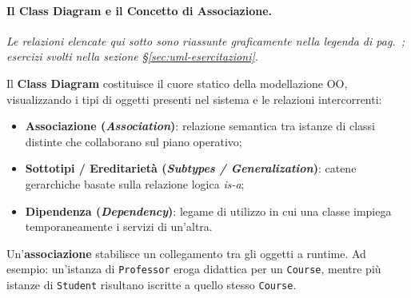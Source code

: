 \documentclass[12pt]{extarticle}
\newcommand{\cn}[1]{\makebox[\linewidth][c]{\textbf{#1}}}
\begin{document}
\paragraph{Il Class Diagram e il Concetto di Associazione.}
\noindent\textit{Le relazioni elencate qui sotto sono riassunte graficamente nella legenda di pag.~\pageref{fig:uml-legenda-relazioni}; esercizi svolti nella sezione \S\ref{sec:uml-esercitazioni}.}

Il \textbf{Class Diagram} costituisce il cuore statico della modellazione OO, visualizzando i tipi di oggetti presenti nel sistema e le relazioni intercorrenti:
\begin{itemize}
    \item \textbf{Associazione (\textit{Association})}: relazione semantica tra istanze di classi distinte che collaborano sul piano operativo;
    \item \textbf{Sottotipi / Ereditarietà (\textit{Subtypes / Generalization})}: catene gerarchiche basate sulla relazione logica \textit{is-a};
    \item \textbf{Dipendenza (\textit{Dependency})}: legame di utilizzo in cui una classe impiega temporaneamente i servizi di un'altra.
\end{itemize}

\noindent Un'\textbf{associazione} stabilisce un collegamento tra gli oggetti a runtime. Ad esempio: un'istanza di \texttt{Professor} eroga didattica per un \texttt{Course}, mentre più istanze di \texttt{Student} risultano iscritte a quello stesso \texttt{Course}.

\begin{figure}[htbp]
    \centering
{}
    \label{fig:concept_association}
\end{figure}
\end{document}

